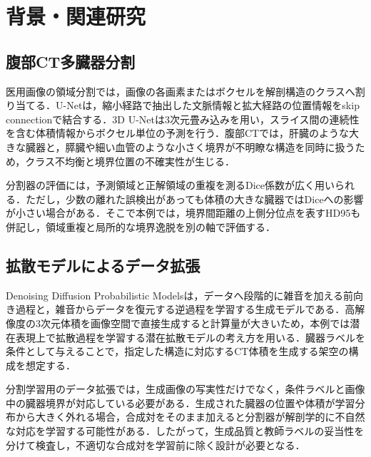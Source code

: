 \chapter{背景・関連研究}

\begin{center}
  \UsamiFictionalExampleNotice
\end{center}

\section{腹部CT多臓器分割}

医用画像の領域分割では，画像の各画素またはボクセルを解剖構造のクラスへ割り当てる．U-Net\cite{ronneberger2015unet}は，縮小経路で抽出した文脈情報と拡大経路の位置情報をskip connectionで結合する．3D U-Net\cite{cicek20163dunet}は3次元畳み込みを用い，スライス間の連続性を含む体積情報からボクセル単位の予測を行う．腹部CTでは，肝臓のような大きな臓器と，膵臓や細い血管のような小さく境界が不明瞭な構造を同時に扱うため，クラス不均衡と境界位置の不確実性が生じる．

分割器の評価には，予測領域と正解領域の重複を測るDice係数が広く用いられる．ただし，少数の離れた誤検出があっても体積の大きな臓器ではDiceへの影響が小さい場合がある．そこで本例では，境界間距離の上側分位点を表すHD95も併記し，領域重複と局所的な境界逸脱を別の軸で評価する．

\section{拡散モデルによるデータ拡張}

Denoising Diffusion Probabilistic Models\cite{ho2020ddpm}は，データへ段階的に雑音を加える前向き過程と，雑音からデータを復元する逆過程を学習する生成モデルである．高解像度の3次元体積を画像空間で直接生成すると計算量が大きいため，本例では潜在表現上で拡散過程を学習する潜在拡散モデル\cite{rombach2022ldm}の考え方を用いる．臓器ラベルを条件として与えることで，指定した構造に対応するCT体積を生成する架空の構成を想定する．

分割学習用のデータ拡張では，生成画像の写実性だけでなく，条件ラベルと画像中の臓器境界が対応している必要がある．生成された臓器の位置や体積が学習分布から大きく外れる場合，合成対をそのまま加えると分割器が解剖学的に不自然な対応を学習する可能性がある．したがって，生成品質と教師ラベルの妥当性を分けて検査し，不適切な合成対を学習前に除く設計が必要となる．

